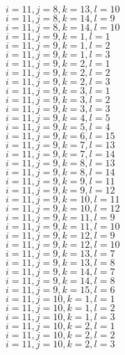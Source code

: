 \documentclass[14pt]{article}
\begin{document}
    $i=11,j=8,k=13,l=10 $ \\ 
    $i=11,j=8,k=14,l=9 $ \\ 
    $i=11,j=8,k=14,l=10 $ \\ 
    $i=11,j=9,k=1,l=1 $ \\ 
    $i=11,j=9,k=1,l=2 $ \\ 
    $i=11,j=9,k=1,l=3 $ \\ 
    $i=11,j=9,k=2,l=1 $ \\ 
    $i=11,j=9,k=2,l=2 $ \\ 
    $i=11,j=9,k=2,l=3 $ \\ 
    $i=11,j=9,k=3,l=1 $ \\ 
    $i=11,j=9,k=3,l=2 $ \\ 
    $i=11,j=9,k=3,l=3 $ \\ 
    $i=11,j=9,k=4,l=5 $ \\ 
    $i=11,j=9,k=5,l=4 $ \\ 
    $i=11,j=9,k=6,l=15 $ \\ 
    $i=11,j=9,k=7,l=13 $ \\ 
    $i=11,j=9,k=7,l=14 $ \\ 
    $i=11,j=9,k=8,l=13 $ \\ 
    $i=11,j=9,k=8,l=14 $ \\ 
    $i=11,j=9,k=9,l=11 $ \\ 
    $i=11,j=9,k=9,l=12 $ \\ 
    $i=11,j=9,k=10,l=11 $ \\ 
    $i=11,j=9,k=10,l=12 $ \\ 
    $i=11,j=9,k=11,l=9 $ \\ 
    $i=11,j=9,k=11,l=10 $ \\ 
    $i=11,j=9,k=12,l=9 $ \\ 
    $i=11,j=9,k=12,l=10 $ \\ 
    $i=11,j=9,k=13,l=7 $ \\ 
    $i=11,j=9,k=13,l=8 $ \\ 
    $i=11,j=9,k=14,l=7 $ \\ 
    $i=11,j=9,k=14,l=8 $ \\ 
    $i=11,j=9,k=15,l=6 $ \\ 
    $i=11,j=10,k=1,l=1 $ \\ 
    $i=11,j=10,k=1,l=2 $ \\ 
    $i=11,j=10,k=1,l=3 $ \\ 
    $i=11,j=10,k=2,l=1 $ \\ 
    $i=11,j=10,k=2,l=2 $ \\ 
    $i=11,j=10,k=2,l=3 $ \\ 
\end{document}
